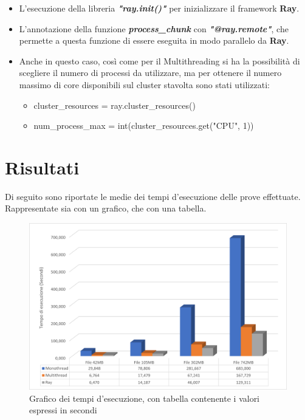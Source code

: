 \documentclass{article}
\begin{document}
    \begin{itemize}
        \item L'esecuzione della libreria \textbf{\textit{"ray.init()"}} per inizializzare il framework \textbf{Ray}.
        \item L'annotazione della funzione \textbf{\textit{process\_chunk}} con \textbf{\textit{"@ray.remote"}}, che permette a questa funzione di essere eseguita in modo parallelo da \textbf{Ray}.
        \item Anche in questo caso, così come per il Multithreading si ha la possibilità di scegliere il numero di processi da utilizzare, ma per ottenere il numero massimo di core disponibili sul cluster stavolta sono stati utilizzati:
        \begin{itemize}
            \item cluster\_resources = ray.cluster\_resources()
            \item num\_process\_max = int(cluster\_resources.get("CPU", 1))
        \end{itemize}
    \end{itemize}
    
    \vspace{10pt}
    
    
    
    \clearpage
    
    \section{Risultati}
    Di seguito sono riportate le medie dei tempi d'esecuzione delle prove effettuate. Rappresentate sia con un grafico, che con una tabella.
    
    \vspace{10pt}
    
    \begin{figure}[h!]
        \centering
        \includegraphics[width=\linewidth]{Grafico.png}
        \caption{Grafico dei tempi d'esecuzione, con tabella contenente i valori espressi in secondi}
    \end{figure}
    
\end{document}
